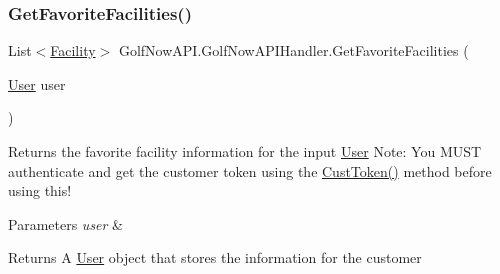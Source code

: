 \subsubsection{\texorpdfstring{GetFavoriteFacilities()}{GetFavoriteFacilities()}}
{\footnotesize\ttfamily List$<$\mbox{\hyperlink{class_golf_now_a_p_i_1_1_facility}{Facility}}$>$ Golf\+Now\+A\+P\+I.\+Golf\+Now\+A\+P\+I\+Handler.\+Get\+Favorite\+Facilities (\begin{DoxyParamCaption}\item[{\mbox{\hyperlink{class_golf_now_a_p_i_1_1_user}{User}}}]{user }\end{DoxyParamCaption})\hspace{0.3cm}{\ttfamily [inline]}}



Returns the favorite facility information for the input \mbox{\hyperlink{class_golf_now_a_p_i_1_1_user}{User}} Note\+: You M\+U\+ST authenticate and get the customer token using the \mbox{\hyperlink{class_golf_now_a_p_i_1_1_golf_now_a_p_i_handler_a8ba0b542b68c1e48166b59c6d6b167fd}{Cust\+Token()}} method before using this! 


\begin{DoxyParams}{Parameters}
{\em user} & \\
\hline
\end{DoxyParams}
\begin{DoxyReturn}{Returns}
A \mbox{\hyperlink{class_golf_now_a_p_i_1_1_user}{User}} object that stores the information for the customer
\end{DoxyReturn}
\mbox{\label{class_golf_now_a_p_i_1_1_golf_now_a_p_i_handler_aaf93dac9ec215cd0d6574d9e4c8de096}} 
